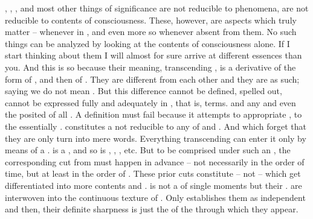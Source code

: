 , , ,  and most other things of
significance are not reducible to phenomena, are not reducible to 
contents of consciousness.  These, however, are aspects which
truly matter -- whenever  in , and even more so whenever
absent from them.
No such things can be analyzed by looking at the  contents of
consciousness alone.  If I start thinking about them I will almost for sure
arrive at different essences than you.  And this is so because their meaning,
transcending , is a derivative of the form of , and
then of .
They are different from each other and they are  as such; saying
 we do not mean .  But this difference cannot be defined,
spelled out, cannot be expressed fully and adequately in , that is,
 terms.  and   any 
and even the posited  of all . 
A definition must fail because it attempts to appropriate , to
 the 
essentially .  constitutes a  not
reducible to any  of  and . 
 And  which forget that they are only 
turn into mere words.
%
%
Everything transcending  can enter it only by
means of a .  is a , and so is ,
, , etc. But to be comprised under such an , the
corresponding {cut} from  must happen in advance -- not
necessarily in the order of time, but at least in the order of .
These prior {cuts} constitute  -- not  -- which
get differentiated into more  contents and .  is not a  of single moments but their
.   are interwoven into the continuous texture of
. Only  establishes them as independent
 and then, their definite sharpness is just the  of
the  through which they appear.

